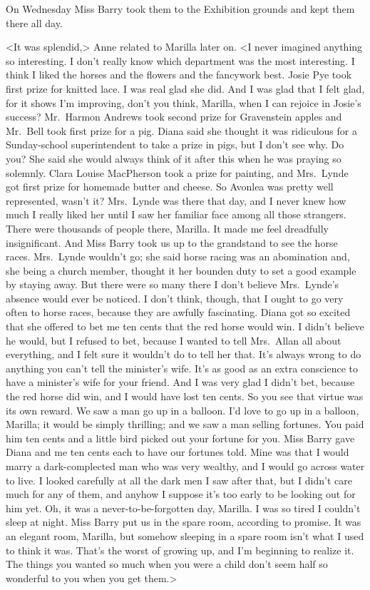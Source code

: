 On Wednesday Miss Barry took them to the Exhibition grounds and kept them there all day.

<It was splendid,> Anne related to Marilla later on. <I never imagined anything so interesting. I don't really know which department was the most interesting. I think I liked the horses and the flowers and the fancywork best. Josie Pye took first prize for knitted lace. I was real glad she did. And I was glad that I felt glad, for it shows I'm improving, don't you think, Marilla, when I can rejoice in Josie's success? Mr.~Harmon Andrews took second prize for Gravenstein apples and Mr.~Bell took first prize for a pig. Diana said she thought it was ridiculous for a Sunday-school superintendent to take a prize in pigs, but I don't see why. Do you? She said she would always think of it after this when he was praying so solemnly. Clara Louise MacPherson took a prize for painting, and Mrs.~Lynde got first prize for homemade butter and cheese. So Avonlea was pretty well represented, wasn't it? Mrs.~Lynde was there that day, and I never knew how much I really liked her until I saw her familiar face among all those strangers. There were thousands of people there, Marilla. It made me feel dreadfully insignificant. And Miss Barry took us up to the grandstand to see the horse races. Mrs.~Lynde wouldn't go; she said horse racing was an abomination and, she being a church member, thought it her bounden duty to set a good example by staying away. But there were so many there I don't believe Mrs.~Lynde's absence would ever be noticed. I don't think, though, that I ought to go very often to horse races, because they are awfully fascinating. Diana got so excited that she offered to bet me ten cents that the red horse would win. I didn't believe he would, but I refused to bet, because I wanted to tell Mrs.~Allan all about everything, and I felt sure it wouldn't do to tell her that. It's always wrong to do anything you can't tell the minister's wife. It's as good as an extra conscience to have a minister's wife for your friend. And I was very glad I didn't bet, because the red horse did win, and I would have lost ten cents. So you see that virtue was its own reward. We saw a man go up in a balloon. I'd love to go up in a balloon, Marilla; it would be simply thrilling; and we saw a man selling fortunes. You paid him ten cents and a little bird picked out your fortune for you. Miss Barry gave Diana and me ten cents each to have our fortunes told. Mine was that I would marry a dark-complected man who was very wealthy, and I would go across water to live. I looked carefully at all the dark men I saw after that, but I didn't care much for any of them, and anyhow I suppose it's too early to be looking out for him yet. Oh, it was a never-to-be-forgotten day, Marilla. I was so tired I couldn't sleep at night. Miss Barry put us in the spare room, according to promise. It was an elegant room, Marilla, but somehow sleeping in a spare room isn't what I used to think it was. That's the worst of growing up, and I'm beginning to realize it. The things you wanted so much when you were a child don't seem half so wonderful to you when you get them.>

